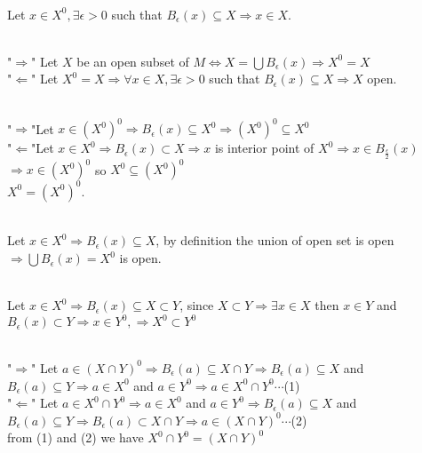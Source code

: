 \documentclass{book}
\begin{document}
\begin{tcolorbox}[enhanced,attach boxed title to top 
center={yshift=-3mm,yshifttext=-1mm},
colback=blue!5!white,colframe=blue!75!black,colbacktitle=red!80!black,
title={Exercise 39.11:},fonttitle=\bfseries,
boxed title style={size=small,colframe=red!50!black} ]
{\color{red}{(a)-$X^0\subset X$ for $X\subset M$.}}\\
Let $x\in X^0,\exists\epsilon>0$ such that $B_\epsilon(x)\subseteq X\Rightarrow 
x\in X$.

{\color{red}{(b)-$X$ is open $\iff X^0=X$.}}\\
"$\Rightarrow$" Let $X$ be an open subset of $M\iff X=\bigcup 
B_\epsilon(x)\Rightarrow X^0=X$\\
"$\Leftarrow$" Let $X^0=X\Rightarrow\forall x\in X,\exists\epsilon>0$ such that 
$B_\epsilon(x)\subseteq X\Rightarrow X$ open.

{\color{red}{(c)-$(X^0)^0=X^0$.}}\\
"$\Rightarrow$"Let $x\in (X^0)^0\Rightarrow B_\epsilon(x)\subseteq X^0\Rightarrow 
(X^0)^0\subseteq X^0$\\
"$\Leftarrow$"Let $x\in X^0\Rightarrow B_\epsilon(x)\subset X\Rightarrow x$ is 
interior point of $X^0\Rightarrow x\in B_{\frac{\epsilon}{2}}(x)$\\
$\Rightarrow x\in (X^0)^0$ so $X^0\subseteq (X^0)^0$\\
$X^0=(X^0)^0$.

{\color{red}{(d)-$X^0$ is open for all $X\in M$.}}\\
Let $x\in X^0\Rightarrow B_\epsilon(x)\subseteq X$, by definition the union of open 
set is open$\Rightarrow\bigcup B_\epsilon(x)=X^0$ is open.

{\color{red}{(e)- if $X\subset Y\subset M$ then $X^0\subset Y^0$, Proof:}}\\
Let $x\in X^0\Rightarrow B_\epsilon(x)\subseteq X\subset Y$, since  $X\subset 
Y\Rightarrow\exists x\in X$ then $x\in Y$ and $B_\epsilon(x)\subset Y\Rightarrow 
x\in Y^0,\Rightarrow X^0\subset Y^0$

{\color{red}{(f)-$X^0\cap Y^0=(X\cap Y)^0$.}}\\
"$\Rightarrow$" Let $a\in (X\cap Y)^0\Rightarrow B_\epsilon(a)\subseteq X\cap
Y\Rightarrow B_\epsilon(a)\subseteq X$ and $B_\epsilon(a)\subseteq Y\Rightarrow a\in
X^0$ and $a\in Y^0\Rightarrow a\in X^0\cap Y^0\cdots $(1)\\
"$\Leftarrow$" Let $a\in X^0\cap Y^0\Rightarrow a\in X^0$ and $a\in Y^0\Rightarrow 
B_\epsilon(a)\subseteq X$ and $B_\epsilon(a)\subseteq Y\Rightarrow 
B_\epsilon(a)\subset X\cap Y\Rightarrow a\in (X\cap Y)^0\cdots $(2)\\
from (1) and (2) we have $X^0\cap Y^0=(X\cap Y)^0$


\end{tcolorbox}
\end{document}

